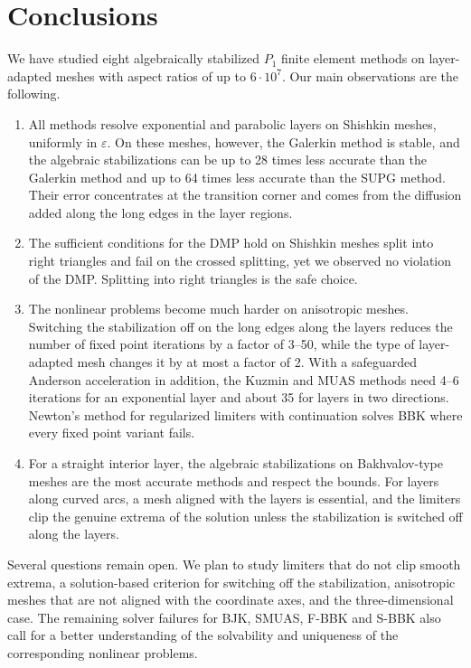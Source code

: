 \documentclass[11pt,a4paper]{article}
\newcommand{\eps}{\varepsilon}
\theoremstyle{remark}
\begin{document}
\section{Conclusions}\label{sec:concl}

We have studied eight algebraically stabilized $P_1$ finite element methods on layer-adapted meshes with aspect
ratios of up to $6\cdot10^7$. Our main observations are the following.
\begin{enumerate}[leftmargin=*]
\item All methods resolve exponential and parabolic layers on Shishkin meshes, uniformly in $\eps$. On these meshes,
  however, the Galerkin method is stable, and the algebraic stabilizations can be up to 28 times less accurate
  than the Galerkin method and up to 64 times less accurate than the SUPG method. Their
  error concentrates at the transition corner and comes from the diffusion added along the long edges in the layer
  regions.
\item The sufficient conditions for the DMP hold on Shishkin meshes split into right triangles and fail on the
  crossed splitting, yet we observed no violation of the DMP. Splitting into right triangles is the safe choice.
\item The nonlinear problems become much harder on anisotropic meshes. Switching the stabilization off on the long
  edges along the layers reduces the number of fixed point iterations by a factor of 3--50, while the type of
  layer-adapted mesh changes it by at most a factor of 2. With a safeguarded Anderson acceleration in addition, the
  Kuzmin and MUAS methods need 4--6 iterations for an exponential layer and about 35 for layers in two directions.
  Newton's method for regularized limiters with continuation solves BBK where every fixed point variant fails.
\item For a straight interior layer, the algebraic stabilizations on Bakhvalov-type meshes are the most accurate
  methods and respect the bounds. For layers along curved arcs, a mesh aligned with the layers is essential, and the
  limiters clip the genuine extrema of the solution unless the stabilization is switched off along the layers.
\end{enumerate}
Several questions remain open. We plan to study limiters that do not clip smooth extrema, a solution-based criterion
for switching off the stabilization, anisotropic meshes that are not aligned with the coordinate axes, and the
three-dimensional case. The remaining solver failures for BJK, SMUAS, F-BBK and S-BBK also call for a better
understanding of the solvability and uniqueness of the corresponding nonlinear problems.
\end{document}
